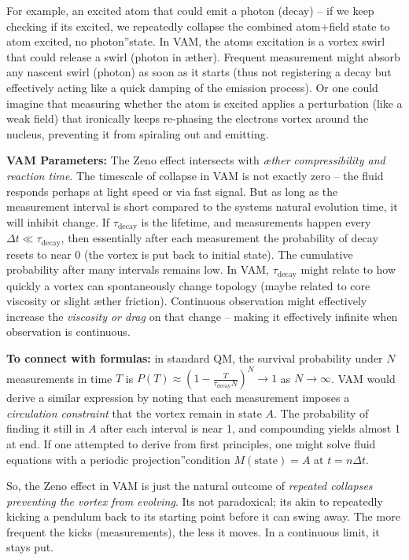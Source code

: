 \documentclass[a4paper, aps,preprint,superscriptaddress, 12pt]{revtex4}
\begin{document}
For example, an excited atom that could emit a photon (decay) – if we keep checking if it\rqs s excited, we repeatedly collapse the combined atom+field state to \grqq atom excited, no photon\textquotedblright state. In VAM, the atom\rqs s excitation is a vortex swirl that could release a swirl (photon in æther). Frequent measurement might absorb any nascent swirl (photon) as soon as it starts (thus not registering a decay but effectively acting like a quick damping of the emission process). Or one could imagine that measuring whether the atom is excited applies a perturbation (like a weak field) that ironically keeps re-phasing the electron\rqs s vortex around the nucleus, preventing it from spiraling out and emitting.


\textbf{VAM Parameters:} The Zeno effect intersects with \textit{æther compressibility and reaction time}. The timescale of collapse in VAM is not exactly zero – the fluid responds perhaps at light speed or via fast signal. But as long as the measurement interval is short compared to the system\rqs s natural evolution time, it will inhibit change. If $\tau_{\text{decay}}$ is the lifetime, and measurements happen every $\Delta t \ll \tau_{\text{decay}}$, then essentially after each measurement the probability of decay resets to near 0 (the vortex is put back to initial state). The cumulative probability after many intervals remains low. In VAM, $\tau_{\text{decay}}$ might relate to how quickly a vortex can spontaneously change topology (maybe related to core viscosity or slight æther friction). Continuous observation might effectively increase the \textit{viscosity or drag} on that change – making it effectively infinite when observation is continuous.


\textbf{To connect with formulas:} in standard QM, the survival probability under $N$ measurements in time $T$ is $P(T) \approx \left(1 - \frac{T}{\tau_{\text{decay}} N}\right)^N \to 1$ as $N\to\infty$. VAM would derive a similar expression by noting that each measurement imposes a \textit{circulation constraint} that the vortex remain in state $A$. The probability of finding it still in $A$ after each interval is near 1, and compounding yields almost 1 at end. If one attempted to derive from first principles, one might solve fluid equations with a periodic \grqq projection\textquotedblright condition $M(\text{state})=A$ at $t = n\Delta t$.


So, the Zeno effect in VAM is just the natural outcome of \textit{repeated collapses preventing the vortex from evolving}. It\rqs s not paradoxical; it\rqs s akin to repeatedly kicking a pendulum back to its starting point before it can swing away. The more frequent the kicks (measurements), the less it moves. In a continuous limit, it stays put.
\end{document}
